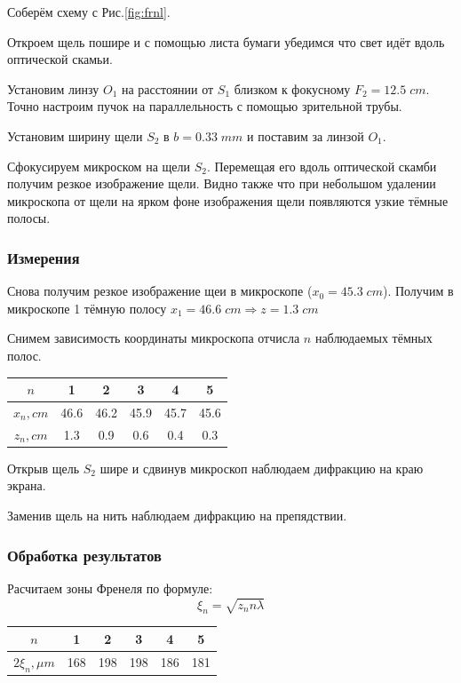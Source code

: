 \documentclass{article}
\begin{document}
Соберём схему с Рис.\ref{fig:frnl}.

Откроем щель пошире и с помощью листа бумаги убедимся что свет идёт вдоль оптической скамьи.

Установим линзу \(O_1\) на расстоянии от \(S_1\) близком к фокусному \(F_2 = 12.5\;cm\). Точно настроим пучок на параллельность
с помощью зрительной трубы.

Установим ширину щели \(S_2\) в \(b = 0.33\;mm\) и поставим за линзой \(O_1\).

Сфокусируем микроском на щели \(S_2\). Перемещая его вдоль оптической скамби получим резкое изображение щели.
Видно также что при небольшом удалении микроскопа от щели на ярком фоне изображения щели
появляются узкие тёмные полосы.
\subsubsection{Измерения}
Снова получим резкое изображение щеи в микроскопе (\(x_0 = 45.3\;cm\)).
Получим в микроскопе 1 тёмную полосу \(x_1 = 46.6\;cm \Rightarrow z = 1.3\;cm\)

Снимем зависимость координаты микроскопа отчисла \(n\) наблюдаемых тёмных полос.

\begin{table}[H]
  \centering
  \begin{tabular}{|c|c|c|c|c|c|}
    \hline
   \(n\)        &   1  &   2  &   3  &   4  &   5    \\\hline
   \(x_n, cm\)  & 46.6 & 46.2 & 45.9 & 45.7 & 45.6 \\\hline
   \(z_n, cm\)  & 1.3  & 0.9  & 0.6  & 0.4  & 0.3 \\\hline
  \end{tabular}
\end{table}

Открыв щель \(S_2\) шире и сдвинув микроскоп наблюдаем дифракцию на краю экрана.

Заменив щель на нить наблюдаем дифракцию на препядствии.

\subsubsection{Обработка результатов}
Расчитаем зоны Френеля по формуле:
\[ \xi_n = \sqrt{z_nn\lambda} \]

\begin{table}[H]
  \centering
  \begin{tabular}{|c|c|c|c|c|c|}
    \hline
   \(n\)              &  1  & 2   &  3  &  4  &  5    \\\hline
   \(2\xi_n, \mu m\)  & 168 & 198 & 198 & 186 & 181   \\\hline
  \end{tabular}
\end{table}
\end{document}
